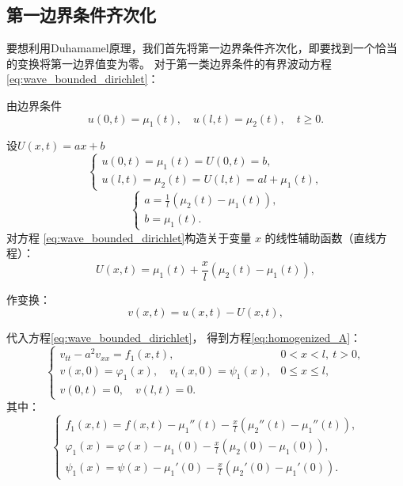 \documentclass[a4paper, 12pt, oneside]{article} %
\numberwithin{subsection}{section}
\numberwithin{subsubsection}{subsection}
\theoremstyle{plain}
\theoremstyle{definition}
\theoremstyle{remark}
\begin{document}
		\subsection{第一边界条件齐次化}
		要想利用Duhamamel原理，我们首先将第一边界条件齐次化，即要找到一个恰当的变换将第一边界值变为零。
		对于第一类边界条件的有界波动方程\eqref{eq:wave_bounded_dirichlet}：
		
		由边界条件
		\begin{equation}
			u(0,t) = \mu_1(t), \quad u(l,t) = \mu_2(t), \quad t \geq 0.
		\end{equation}
		
		设$U(x, t)=ax+b$
		\[
		\begin{cases}
			u(0, t) = \mu_1(t) = U(0, t) = b, \\
			u(l, t) = \mu_2(t) = U(l, t) = al + \mu_1(t),
		\end{cases}
		\]
		\[
		\begin{cases}
			a = \frac{1}{l}(\mu_2(t) - \mu_1(t)), \\
			b = \mu_1(t).
		\end{cases}
		\]
		对方程 \eqref{eq:wave_bounded_dirichlet}构造关于变量 \(x\) 的线性辅助函数（直线方程）：
		\begin{equation}
			U(x, t) = \mu_1(t) + \frac{x}{l}(\mu_2(t) - \mu_1(t)),
		\end{equation}
		
		作变换：
		\begin{equation}
			v(x, t) = u(x, t) - U(x, t),
		\end{equation}
		
		代入方程\eqref{eq:wave_bounded_dirichlet}，
		得到方程\eqref{eq:homogenized_A}：
		\begin{equation}\label{eq:homogenized_A}
			\begin{cases}
				v_{tt} - a^2 v_{xx} = f_1(x, t), & 0 < x < l, \ t > 0, \\
				v(x, 0) = \varphi_1(x), \quad v_t(x, 0) = \psi_1(x), & 0 \leq x \leq l, \\
				v(0, t) = 0, \quad v(l, t) = 0. &
			\end{cases}
		\end{equation}
		其中：
		\begin{equation}
			\begin{cases}
				f_1(x, t) = f(x, t) - \mu_1''(t) - \frac{x}{l}(\mu_2''(t) - \mu_1''(t)), \\
				\varphi_1(x) = \varphi(x) - \mu_1(0) - \frac{x}{l}(\mu_2(0) - \mu_1(0)), \\
				\psi_1(x) = \psi(x) - \mu_1'(0) - \frac{x}{l}(\mu_2'(0) - \mu_1'(0)).
			\end{cases}
		\end{equation}
		
\end{document}
